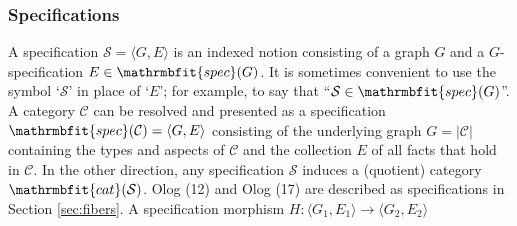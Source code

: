 \documentclass{amsart}
\theoremstyle{remark}
\theoremstyle{definition}
\begin{document}

\subsubsection{Specifications}
%
A specification $\mathcal{S} = {\langle{G,E}\rangle}$ is an indexed notion
consisting of a graph $G$ and a $G$-specification $E \in \mathrmbfit{spec}(G)$.
It is sometimes convenient to use the symbol `$\mathcal{S}$' in place of `$E$';
for example,
to say that ``$\mathcal{S} \in \mathrmbfit{spec}(G)$''.
A category $\mathcal{C}$ can be resolved and presented as 
a specification $\mathrmbfit{spec}(\mathcal{C}) = {\langle{G,E}\rangle}$ 
consisting of the underlying graph $G = |\mathcal{C}|$ containing the types and aspects of $\mathcal{C}$ and 
the collection $E$ of all facts that hold in $\mathcal{C}$.
In the other direction,
any specification $\mathcal{S}$ induces a (quotient) category $\mathrmbfit{cat}(\mathcal{S})$.
Olog (12) and Olog (17) are described as specifications in Section \ref{sec:fibers}. 
%
A specification morphism $H \colon {\langle{G_{1},E_{1}}\rangle} \rightarrow {\langle{G_{2},E_{2}}\rangle}$
\end{document}
